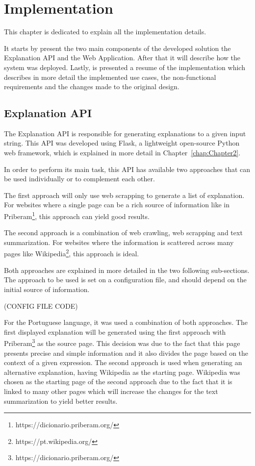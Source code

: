 
\chapter{Implementation} %
\label{chap:Chapter5}

This chapter is dedicated to explain all the implementation details.

It starts by present the two main components of the developed solution the Explanation API and the Web Application.
After that it will describe how the system was deployed.
Lastly, is presented a resume of the implementation which describes in more detail the implemented use cases, the non-functional requirements and the changes made to the original design.

\section{Explanation API}

The Explanation API is responsible for generating explanations to a given input string.
This API was developed using Flask, a lightweight open-source Python web framework, which is explained in more detail in Chapter~\ref{chap:Chapter2}.

In order to perform its main task, this API has available two approaches that can be used individually or to complement each other.

The first approach will only use web scrapping to generate a list of explanation.
For websites where a single page can be a rich source of information like in Priberam\footnote{https://dicionario.priberam.org/}, this approach can yield good results.

The second approach is a combination of web crawling, web scrapping and text summarization.
For websites where the information is scattered across many pages like Wikipedia\footnote{https://pt.wikipedia.org/}, this approach is ideal.

Both approaches are explained in more detailed in the two following sub-sections.
The approach to be used is set on a configuration file, and should depend on the initial source of information.

(CONFIG FILE CODE) %

For the Portuguese language, it was used a combination of both approaches.
The first displayed explanation will be generated using the first approach with Priberam\footnote{https://dicionario.priberam.org/} as the source page.
This decision was due to the fact that this page presents precise and simple information and it also divides the page based on the context of a given expression.
The second approach is used when generating an alternative explanation, having Wikipedia as the starting page.
Wikipedia was chosen as the starting page of the second approach due to the fact that it is linked to many other pages which will increase the changes for the text summarization to yield better results.

